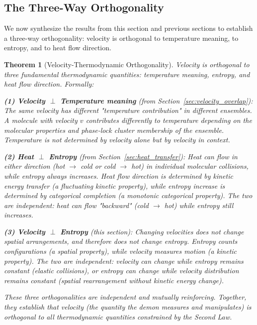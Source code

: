 \documentclass[12pt,a4paper]{article}
\newtheorem{theorem}{Theorem}[section]
\theoremstyle{definition}
\theoremstyle{remark}
\begin{document}
\subsection{The Three-Way Orthogonality}

We now synthesize the results from this section and previous sections to establish a three-way orthogonality: velocity is orthogonal to temperature meaning, to entropy, and to heat flow direction.

\begin{theorem}[Velocity-Thermodynamic Orthogonality]
\label{thm:three_orthogonality}
Velocity is orthogonal to three fundamental thermodynamic quantities: temperature meaning, entropy, and heat flow direction. Formally:

\textbf{(1) Velocity $\perp$ Temperature meaning} (from Section~\ref{sec:velocity_overlap}): The same velocity has different "temperature contribution" in different ensembles. A molecule with velocity $v$ contributes differently to temperature depending on the molecular properties and phase-lock cluster membership of the ensemble. Temperature is not determined by velocity alone but by velocity in context.

\textbf{(2) Heat $\perp$ Entropy} (from Section~\ref{sec:heat_transfer}): Heat can flow in either direction (hot $\to$ cold or cold $\to$ hot) in individual molecular collisions, while entropy always increases. Heat flow direction is determined by kinetic energy transfer (a fluctuating kinetic property), while entropy increase is determined by categorical completion (a monotonic categorical property). The two are independent: heat can flow "backward" (cold $\to$ hot) while entropy still increases.

\textbf{(3) Velocity $\perp$ Entropy} (this section): Changing velocities does not change spatial arrangements, and therefore does not change entropy. Entropy counts configurations (a spatial property), while velocity measures motion (a kinetic property). The two are independent: velocity can change while entropy remains constant (elastic collisions), or entropy can change while velocity distribution remains constant (spatial rearrangement without kinetic energy change).

These three orthogonalities are independent and mutually reinforcing. Together, they establish that velocity (the quantity the demon measures and manipulates) is orthogonal to all thermodynamic quantities constrained by the Second Law.
\end{theorem}
\end{document}
